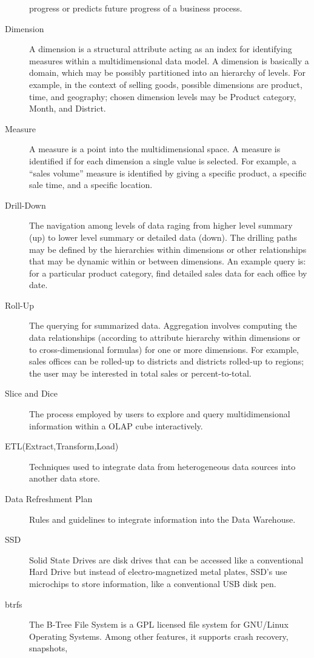\begin{description}
progress or predicts future progress of a business process.
\item[Dimension] A dimension is a structural attribute acting as an index for
identifying measures within a multidimensional data model. 
A dimension is basically a domain, which may be possibly partitioned into an 
hierarchy of levels. For example, in the context of selling goods, possible 
dimensions are product, time, and geography; chosen dimension levels may be 
Product category, Month, and District.
\item[Measure] A measure is a point into the multidimensional space. A measure
is identified if for each dimension a single value is selected. For example, 
a “sales volume” measure is identified by giving a specific product, 
a specific sale time, and a specific location.
\item[Drill-Down] The navigation among levels of data raging from higher level
summary (up) to lower level summary or detailed data (down). The drilling paths 
may be defined by the hierarchies within dimensions or other relationships that 
may be dynamic within or between dimensions. An example query is: for a 
particular product category, find detailed sales data for each office by date.
\item[Roll-Up] The querying for summarized data. Aggregation involves
computing the data relationships (according to attribute hierarchy within 
dimensions or to cross-dimensional formulas) for one or more dimensions. 
For example, sales offices can be rolled-up to districts and districts 
rolled-up to regions; the user may be interested in total sales or 
percent-to-total.
\item[Slice and Dice] The process employed by users to explore and query
multidimensional information within a OLAP cube interactively.
\item[ETL(Extract,Transform,Load)] Techniques used to integrate data from
heterogeneous data sources into another data store.
\item[Data Refreshment Plan] Rules and guidelines to integrate information
into the Data Warehouse.
\item[SSD] Solid State Drives are disk drives that can be accessed like a
conventional Hard Drive but instead of electro-magnetized metal plates, SSD’s 
use microchips to store information, like a conventional USB disk pen.
\item[btrfs] The B-Tree File System is a GPL licensed file system for GNU/Linux
Operating Systems. Among other features, it supports crash recovery, snapshots,

\end{description}
